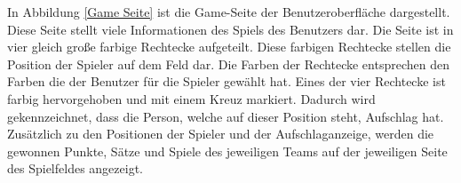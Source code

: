 In Abbildung \ref{Game Seite} ist die Game-Seite der Benutzeroberfläche dargestellt. Diese Seite stellt viele Informationen des Spiels des Benutzers dar. Die Seite ist in vier gleich große farbige Rechtecke aufgeteilt. Diese farbigen Rechtecke stellen die Position der Spieler auf dem Feld dar. Die Farben der Rechtecke entsprechen den Farben die der Benutzer für die Spieler gewählt hat. Eines der vier Rechtecke ist farbig hervorgehoben und mit einem Kreuz markiert. Dadurch wird gekennzeichnet, dass die Person, welche auf dieser Position steht, Aufschlag hat. Zusätzlich zu den Positionen der Spieler und der Aufschlaganzeige, werden die gewonnen Punkte, Sätze und Spiele des jeweiligen Teams auf der jeweiligen Seite des Spielfeldes angezeigt.
